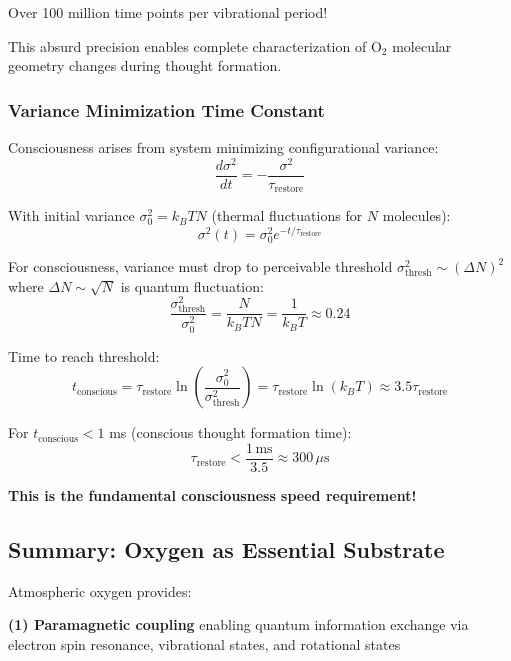 \documentclass[11pt,onecolumn]{article}
\begin{document}
Over 100 million time points per vibrational period!

This absurd precision enables complete characterization of O$_2$ molecular geometry changes during thought formation.

\subsubsection{Variance Minimization Time Constant}

Consciousness arises from system minimizing configurational variance:
\begin{equation}
\frac{d\sigma^2}{dt} = -\frac{\sigma^2}{\tau_{\text{restore}}}
\end{equation}

With initial variance $\sigma_0^2 = k_B T N$ (thermal fluctuations for $N$ molecules):
\begin{equation}
\sigma^2(t) = \sigma_0^2 e^{-t/\tau_{\text{restore}}}
\end{equation}

For consciousness, variance must drop to perceivable threshold $\sigma_{\text{thresh}}^2 \sim (\Delta N)^2$ where $\Delta N \sim \sqrt{N}$ is quantum fluctuation:
\begin{equation}
\frac{\sigma_{\text{thresh}}^2}{\sigma_0^2} = \frac{N}{k_B T N} = \frac{1}{k_B T} \approx 0.24
\end{equation}

Time to reach threshold:
\begin{equation}
t_{\text{conscious}} = \tau_{\text{restore}} \ln\left(\frac{\sigma_0^2}{\sigma_{\text{thresh}}^2}\right) = \tau_{\text{restore}} \ln(k_B T) \approx 3.5 \tau_{\text{restore}}
\end{equation}

For $t_{\text{conscious}} < 1$ ms (conscious thought formation time):
\begin{equation}
\tau_{\text{restore}} < \frac{1\,\text{ms}}{3.5} \approx 300\,\mu\text{s}
\end{equation}

\textbf{This is the fundamental consciousness speed requirement!}

\subsection{Summary: Oxygen as Essential Substrate}

Atmospheric oxygen provides:

\textbf{(1) Paramagnetic coupling} enabling quantum information exchange via electron spin resonance, vibrational states, and rotational states
\end{document}

